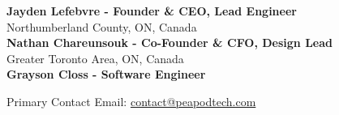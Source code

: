 \scriptsize{
    \textbf{Jayden Lefebvre - Founder \& CEO, Lead Engineer}\\
    Northumberland County, ON, Canada\\
    \vspace{.5cm}
    \textbf{Nathan Chareunsouk - Co-Founder \& CFO, Design Lead}\\Greater Toronto Area, ON, Canada\\
    \vspace{.5cm}
    \textbf{Grayson Closs - Software Engineer}
}

\vspace{.75cm}

Primary Contact Email: \uline{contact@peapodtech.com}